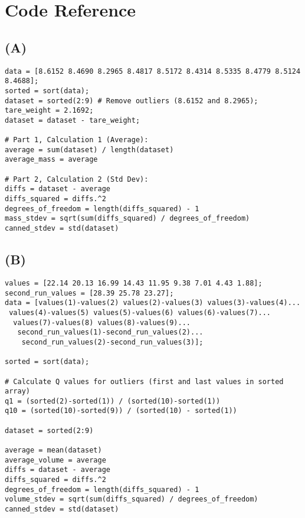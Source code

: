 \documentclass{article}
\begin{document}
\newpage
\section{Code Reference}
    \subsection{(A)}
        \begin{lstlisting}
data = [8.6152 8.4690 8.2965 8.4817 8.5172 8.4314 8.5335 8.4779 8.5124 8.4688];
sorted = sort(data);
dataset = sorted(2:9) # Remove outliers (8.6152 and 8.2965);
tare_weight = 2.1692;
dataset = dataset - tare_weight;

# Part 1, Calculation 1 (Average):
average = sum(dataset) / length(dataset)
average_mass = average

# Part 2, Calculation 2 (Std Dev):
diffs = dataset - average
diffs_squared = diffs.^2
degrees_of_freedom = length(diffs_squared) - 1
mass_stdev = sqrt(sum(diffs_squared) / degrees_of_freedom)
canned_stdev = std(dataset)
        \end{lstlisting}

    \subsection{(B)}
        \begin{lstlisting}
values = [22.14 20.13 16.99 14.43 11.95 9.38 7.01 4.43 1.88];
second_run_values = [28.39 25.78 23.27];
data = [values(1)-values(2) values(2)-values(3) values(3)-values(4)...
 values(4)-values(5) values(5)-values(6) values(6)-values(7)...
  values(7)-values(8) values(8)-values(9)...
   second_run_values(1)-second_run_values(2)...
    second_run_values(2)-second_run_values(3)];

sorted = sort(data);

# Calculate Q values for outliers (first and last values in sorted array)
q1 = (sorted(2)-sorted(1)) / (sorted(10)-sorted(1))
q10 = (sorted(10)-sorted(9)) / (sorted(10) - sorted(1))

dataset = sorted(2:9)

average = mean(dataset)
average_volume = average
diffs = dataset - average
diffs_squared = diffs.^2
degrees_of_freedom = length(diffs_squared) - 1
volume_stdev = sqrt(sum(diffs_squared) / degrees_of_freedom)
canned_stdev = std(dataset)
        \end{lstlisting}
\end{document}
